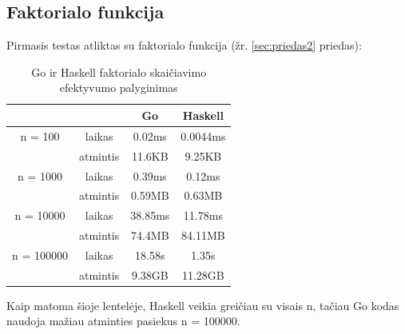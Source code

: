 \documentclass{VUMIFPSkursinis}
\begin{document}
\subsection{Faktorialo funkcija}
Pirmasis testas atliktas su faktorialo funkcija (žr. \ref{sec:priedas2} priedas): 
\begin{center}
	\centering
	\begin{table}[H]
		\caption{Go ir Haskell faktorialo skaičiavimo efektyvumo palyginimas}
		\centering
	\begin{tabular}{ cccc } 
	& & \textbf{Go} & \textbf{Haskell}  \\
	\midrule
	n = 100 & laikas & 0.02ms & 0.0044ms    \\
	& atmintis & 11.6KB & 9.25KB \\
	\midrule
	n = 1000 & laikas & 0.39ms & 0.12ms  \\
	& atmintis & 0.59MB & 0.63MB \\
	\midrule
	n = 10000 & laikas & 38.85ms & 11.78ms  \\
	& atmintis & 74.4MB & 84.11MB \\
	\midrule
	n = 100000 & laikas & 18.58s & 1.35s  \\
	& atmintis & 9.38GB & 11.28GB \\
	\end{tabular}
	\centering
\end{table}
\end{center}
	Kaip matoma šioje lentelėje, Haskell veikia greičiau su visais n, tačiau Go kodas naudoja mažiau atminties pasiekus n = 100000. 
\end{document}
